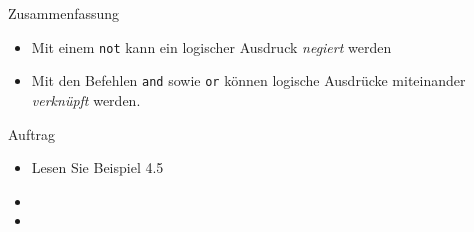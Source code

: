 \begin{frame}[fragile]{Zusammenfassung}
\begin{itemize}
	\item Mit einem \lstinline|not| kann ein logischer Ausdruck \textit{negiert} werden
	\item Mit den Befehlen \lstinline|and| sowie \lstinline|or| können logische Ausdrücke miteinander \textit{verknüpft} werden.
\end{itemize}
\end{frame}

\begin{frame}{Auftrag}
\begin{itemize}
    \item Lesen Sie Beispiel 4.5
    \item {}
    \item {}
\end{itemize}
\end{frame}
